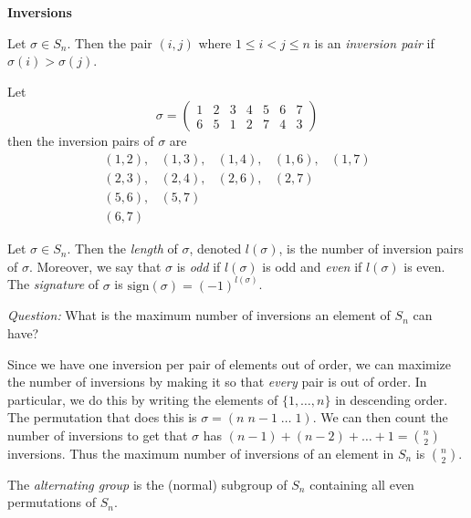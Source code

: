 \noindent\textbf{Inversions}

\begin{definition}
    Let $\sigma\in S_n$. Then the pair $(i,j)$ where $1\leq i< j\leq n$ is an \textit{inversion pair} if
    $\sigma(i)>\sigma(j)$.
\end{definition}

\begin{example}
    Let
    \[
        \sigma = \begin{pmatrix}
            1&2&3&4&5&6&7\\
            6&5&1&2&7&4&3
        \end{pmatrix}
    \]
    then the inversion pairs of $\sigma$ are
    \[
        \begin{array}{lllll}
            (1,2),&(1,3),&(1,4),&(1,6),&(1,7)\\
            (2,3),&(2,4),&(2,6),&(2,7)\\
            (5,6),&(5,7)\\
            (6,7)
        \end{array}
    \]
\end{example}

\begin{definition}
    Let $\sigma\in S_n$. Then the \textit{length} of $\sigma$, denoted $l(\sigma)$, is the number of inversion pairs of
    $\sigma$. Moreover, we say that $\sigma$ is \textit{odd} if $l(\sigma)$ is odd and \textit{even} if $l(\sigma)$ is
    even. The \textit{signature} of $\sigma$ is $\text{sign}(\sigma)=(-1)^{l(\sigma)}$.
\end{definition}

\noindent\textit{Question:} What is the maximum number of inversions an element of $S_n$ can have?

\noindent Since we have one inversion per pair of elements out of order, we can maximize the number of inversions by
making it so that \textit{every} pair is out of order. In particular, we do this by writing the elements of
$\{1,\ldots,n\}$ in descending order. The permutation that does this is $\sigma=(n\;n-1\;\ldots\;1)$. We can then count
the number of inversions to get that $\sigma$ has $(n-1)+(n-2)+\ldots+1=\binom{n}{2}$ inversions. Thus the maximum
number of inversions of an element in $S_n$ is $\binom{n}{2}$.

\begin{definition}
    The \textit{alternating group} is the (normal) subgroup of $S_n$ containing all even permutations of $S_n$.
\end{definition}

